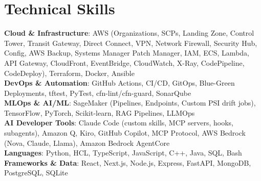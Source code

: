 \section{\textbf{Technical Skills}}
\vspace{-2pt}
\begin{itemize}[leftmargin=0.05in, label={}]
    \small{\item{
     \textbf{Cloud \& Infrastructure}{: AWS (Organizations, SCPs, Landing Zone, Control Tower, Transit Gateway, Direct Connect, VPN, Network Firewall, Security Hub, Config, AWS Backup, Systems Manager Patch Manager, IAM, ECS, Lambda, API Gateway, CloudFront, EventBridge, CloudWatch, X-Ray, CodePipeline, CodeDeploy), Terraform, Docker, Ansible} \\
     \textbf{DevOps \& Automation}{: GitHub Actions, CI/CD, GitOps, Blue-Green Deployments, tftest, PyTest, cfn-lint/cfn-guard, SonarQube} \\
     \textbf{MLOps \& AI/ML}{: SageMaker (Pipelines, Endpoints, Custom PSI drift jobs), TensorFlow, PyTorch, Scikit-learn, RAG Pipelines, LLMOps} \\
     \textbf{AI Developer Tools}{: Claude Code (custom skills, MCP servers, hooks, subagents), Amazon Q, Kiro, GitHub Copilot, MCP Protocol, AWS Bedrock (Nova, Claude, Llama), Amazon Bedrock AgentCore} \\
     \textbf{Languages}{: Python, HCL, TypeScript, JavaScript, C++, Java, SQL, Bash} \\
     \textbf{Frameworks \& Data}{: React, Next.js, Node.js, Express, FastAPI, MongoDB, PostgreSQL, SQLite}
    }}
\end{itemize}
\vspace{-2mm}
